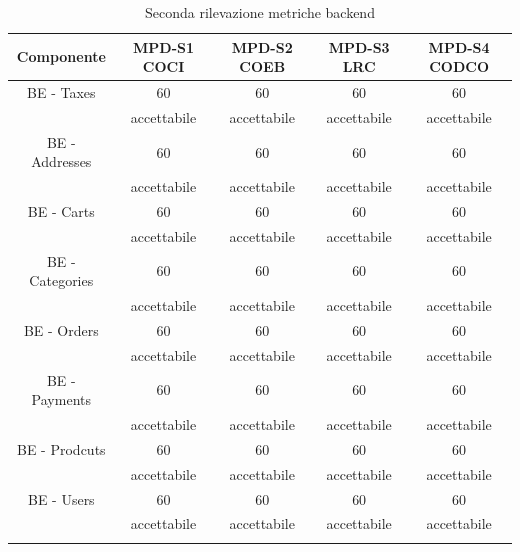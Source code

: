 \begin{center}
    \begin{longtable}{|c|c|c|c|c|}
        \hline
        \rowcolor{lighter-grayer}
        \textbf{Componente}         & \textbf{MPD-S1 COCI}  & \textbf{MPD-S2 COEB} & \textbf{MPD-S3 LRC} & \textbf{MPD-S4 CODCO}\\
        \hline
        \endfirsthead

        \hline
        BE - Taxes & 60 & 60  & 60 & 60                       \\
        & accettabile & accettabile  & accettabile & accettabile                       \\
        BE - Addresses & 60 & 60  & 60 & 60                       \\
        & accettabile & accettabile  & accettabile & accettabile                       \\
        BE - Carts & 60 & 60  & 60 & 60                       \\
        & accettabile & accettabile  & accettabile & accettabile                       \\
        BE - Categories & 60 & 60  & 60 & 60                       \\
        & accettabile & accettabile  & accettabile & accettabile                       \\
        BE - Orders & 60 & 60  & 60 & 60                       \\
        & accettabile & accettabile  & accettabile & accettabile                       \\
        BE - Payments & 60 & 60  & 60 & 60                       \\
        & accettabile & accettabile  & accettabile & accettabile                       \\
        BE - Prodcuts & 60 & 60  & 60 & 60                       \\
        & accettabile & accettabile  & accettabile & accettabile                       \\
        BE - Users & 60 & 60  & 60 & 60                       \\
        & accettabile & accettabile  & accettabile & accettabile                       \\

        \hline
        \rowcolor{white}
        \caption{Seconda rilevazione metriche backend}
    \end{longtable}

    
\end{center}


